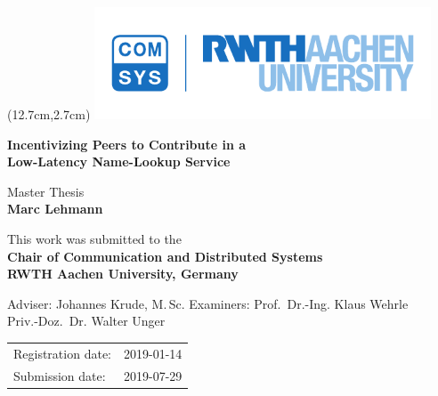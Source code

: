 
\titlehead{
} %


\begin{titlepage}

\begin{textblock*}{10cm} (12.7cm,2.7cm)
\includegraphics[width=10cm,keepaspectratio]{logos/rwth_comsys_bild_cmyk}
\end{textblock*}

\let\footnotesize\small \let\footnoterule\relax

\hbox{}
\vfill

\centering

\begin{doublespace}
{\huge\sffamily\textbf{Incentivizing Peers to Contribute in a \\[5pt]
                       Low-Latency Name-Lookup Service}}
\end{doublespace}
\vskip 2cm

{\large\sffamily

Master Thesis\\[5pt]
\textbf{Marc Lehmann}
\vskip 1cm

This work was submitted to the\\[5pt]
\textbf{Chair of Communication and Distributed Systems\\[5pt]
        RWTH Aachen University, Germany}
\vskip 2cm

Adviser:
\vskip 2mm
Johannes Krude, M.$\,$Sc.
\vskip 5mm
Examiners:
\vskip 2mm
Prof.~Dr.-Ing. Klaus Wehrle\\
Priv.-Doz.~Dr. Walter Unger
\vskip 1cm

\begin{tabular}{R{6cm}p{6cm}}
Registration date:  & 2019-01-14 \\
Submission date:    & 2019-07-29 \\
\end{tabular}

} %

\vfill

\end{titlepage}
